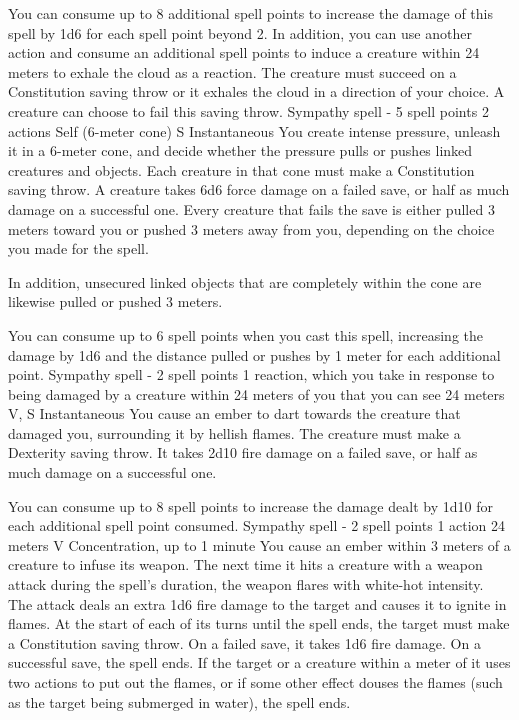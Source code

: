     You can consume up to 8 additional spell points to increase the damage of this spell by 1d6 for each spell point beyond 2.
    In addition, you can use another action and consume an additional spell points to induce a creature within 24 meters to exhale the cloud as a reaction.
    The creature must succeed on a Constitution saving throw or it exhales the cloud in a direction of your choice.
    A creature can choose to fail this saving throw.
    {Sympathy spell - 5 spell points}
    {2 actions}
    {Self (6-meter cone)}
    {S}
    {Instantaneous}
    You create intense pressure, unleash it in a 6-meter cone, and decide whether the pressure pulls or pushes linked creatures and objects.
    Each creature in that cone must make a Constitution saving throw.
    A creature takes 6d6 force damage on a failed save, or half as much damage on a successful one.
    Every creature that fails the save is either pulled 3 meters toward you or pushed 3 meters away from you, depending on the choice you made for the spell.

    In addition, unsecured linked objects that are completely within the cone are likewise pulled or pushed 3 meters.

    You can consume up to 6 spell points when you cast this spell, increasing the damage by 1d6 and the distance pulled or pushes by 1 meter for each additional point.
    {Sympathy spell - 2 spell points}
    {1 reaction, which you take in response to being damaged by a creature within 24 meters of you that you can see}
    {24 meters}
    {V, S}
    {Instantaneous}
    You cause an ember to dart towards the creature that damaged you, surrounding it by hellish flames.
    The creature must make a Dexterity saving throw.
    It takes 2d10 fire damage on a failed save, or half as much damage on a successful one.

    You can consume up to 8 spell points to increase the damage dealt by 1d10 for each additional spell point consumed.
    {Sympathy spell - 2 spell points}
    {1 action}
    {24 meters}
    {V}
    {Concentration, up to 1 minute}
    You cause an ember within 3 meters of a creature to infuse its weapon.
    The next time it hits a creature with a weapon attack during the spell's duration, the weapon flares with white-hot intensity.
    The attack deals an extra 1d6 fire damage to the target and causes it to ignite in flames.
    At the start of each of its turns until the spell ends, the target must make a Constitution saving throw.
    On a failed save, it takes 1d6 fire damage.
    On a successful save, the spell ends.
    If the target or a creature within a meter of it uses two actions to put out the flames, or if some other effect douses the flames (such as the target being submerged in water), the spell ends.

